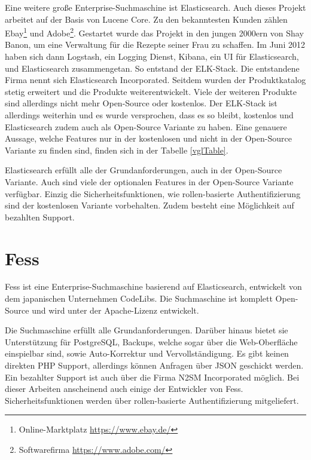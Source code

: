 Eine weitere große Enterprise-Suchmaschine ist Elasticsearch. Auch dieses Projekt arbeitet auf der Basis von Lucene Core. Zu den bekanntesten Kunden zählen Ebay\footnote{Online-Marktplatz \url{https://www.ebay.de/}} und Adobe\footnote{Softwarefirma \url{https://www.adobe.com/}}. Gestartet wurde das Projekt in den jungen 2000ern von Shay Banon, um eine Verwaltung für die Rezepte seiner Frau zu schaffen. Im Juni 2012 haben sich dann Logstash, ein Logging Dienst, Kibana, ein UI für Elasticsearch, und Elasticsearch zusammengetan. So entstand der ELK-Stack. Die entstandene Firma nennt sich Elasticsearch Incorporated. Seitdem wurden der Produktkatalog stetig erweitert und die Produkte weiterentwickelt. Viele der weiteren Produkte sind allerdings nicht mehr Open-Source oder kostenlos. Der ELK-Stack ist allerdings weiterhin und es wurde versprochen, dass es so bleibt, kostenlos und Elasticsearch zudem auch als Open-Source Variante zu haben. Eine genauere Aussage, welche Features nur in der kostenlosen und nicht in der Open-Source Variante zu finden sind, finden sich in der Tabelle \ref{vglTable}.

Elasticsearch erfüllt alle der Grundanforderungen, auch in der Open-Source Variante. Auch sind viele der optionalen Features in der Open-Source Variante verfügbar. Einzig die Sicherheitsfunktionen, wie rollen-basierte Authentifizierung sind der kostenlosen Variante vorbehalten. Zudem besteht eine Möglichkeit auf bezahlten Support. \cite{Elasticsearch.2019}

\section{Fess}
\label{fess}

Fess ist eine Enterprise-Suchmaschine basierend auf Elasticsearch, entwickelt von dem japanischen Unternehmen CodeLibs. Die Suchmaschine ist komplett Open-Source und wird unter der Apache-Lizenz entwickelt.

Die Suchmaschine erfüllt alle Grundanforderungen. Darüber hinaus bietet sie Unterstützung für PostgreSQL, Backups, welche sogar über die Web-Oberfläche einspielbar sind, sowie Auto-Korrektur und Vervollständigung. Es gibt keinen direkten PHP Support, allerdings können Anfragen über JSON geschickt werden. Ein bezahlter Support ist auch über die Firma N2SM Incorporated möglich. \cite{N2SM.2019} Bei dieser Arbeiten anscheinend auch einige der Entwickler von Fess. Sicherheitsfunktionen werden über rollen-basierte Authentifizierung mitgeliefert. \cite{CodeLibs.2019}


